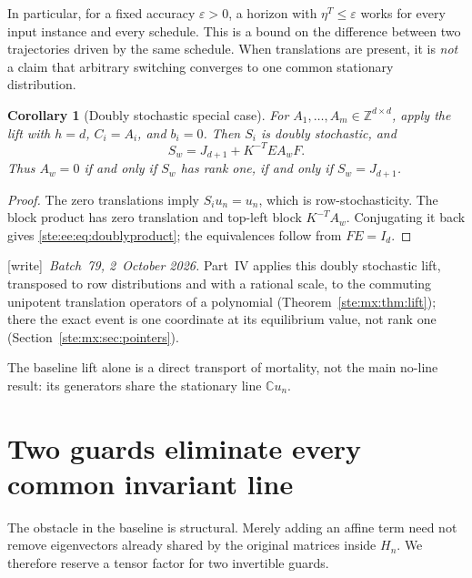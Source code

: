 \documentclass[11pt,letterpaper]{article}
\newtheorem{corollary}[theorem]{Corollary}
\theoremstyle{definition}
\theoremstyle{remark}
\newcommand{\Z}{\mathbb Z}
\newcommand{\C}{\mathbb C}
\newcommand{\wtag}{\textup{[write]}}
\begin{document}
In particular, for a fixed accuracy $\varepsilon>0$, a horizon with
$\eta^T\leq\varepsilon$ works for every input instance and every schedule. This
is a bound on the difference between two trajectories driven by the same
schedule. When translations are present, it is \emph{not} a claim that arbitrary
switching converges to one common stationary distribution.

\begin{corollary}[Doubly stochastic special case]\label{ste:ee:cor:double}
For $A_1,\ldots,A_m\in\Z^{d\times d}$, apply the lift with $h=d$, $C_i=A_i$,
and $b_i=0$. Then $S_i$ is doubly stochastic, and
\begin{equation}
 S_w=J_{d+1}+K^{-T}EA_wF.
 \label{ste:ee:eq:doublyproduct}
\end{equation}
Thus $A_w=0$ if and only if $S_w$ has rank one, if and only if $S_w=J_{d+1}$.
\end{corollary}
\begin{proof}
The zero translations imply $S_i u_n=u_n$, which is row-stochasticity. The block
product has zero translation and top-left block $K^{-T}A_w$. Conjugating it back
gives \eqref{ste:ee:eq:doublyproduct}; the equivalences follow from $FE=I_d$.
\end{proof}

\wtag\ \emph{Batch~79, 2~October 2026.} Part~IV applies this doubly stochastic lift, transposed to row distributions and with a rational scale, to the commuting unipotent translation operators of a polynomial (Theorem~\ref{ste:mx:thm:lift}); there the exact event is one coordinate at its equilibrium value, not rank one (Section~\ref{ste:mx:sec:pointers}).

The baseline lift alone is a direct transport of mortality, not the main
no-line result: its generators share the stationary line $\C u_n$.

\section{Two guards eliminate every common invariant line}
\label{ste:ee:sec:linefree}

The obstacle in the baseline is structural. Merely adding an affine term need
not remove eigenvectors already shared by the original matrices inside $H_n$.
We therefore reserve a tensor factor for two invertible guards.
\end{document}
